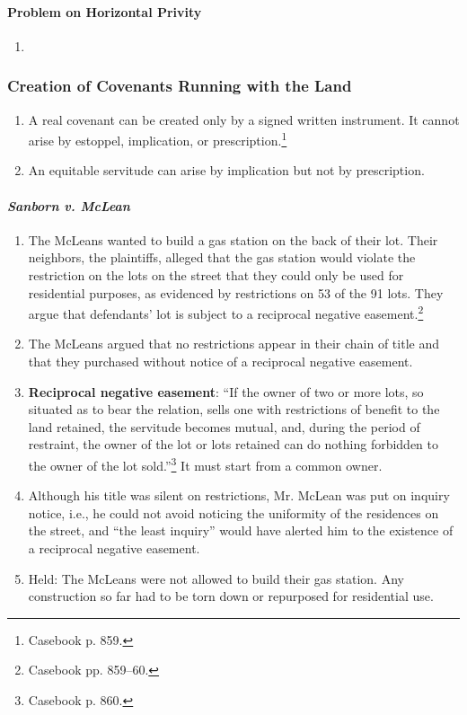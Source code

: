 \paragraph{Problem on Horizontal Privity}

\begin{enumerate}
    \item %
\end{enumerate}

\subsubsection{Creation of Covenants Running with the Land}

\begin{enumerate}
    \item A real covenant can be created only by a signed written instrument. 
    It cannot arise by estoppel, implication, or 
    prescription.\footnote{Casebook p. 859.}
    \item An equitable servitude can arise by implication but not by 
    prescription. %
\end{enumerate}

\paragraph{\emph{Sanborn v. McLean}}

\begin{enumerate}
    \item The McLeans wanted to build a gas station on the back of their lot. 
    Their neighbors, the plaintiffs, alleged that the gas station would 
    violate the restriction on the lots on the street that they could only be 
    used for residential purposes, as evidenced by restrictions on 53 of the 
    91 lots. They argue that defendants' lot is subject to a reciprocal 
    negative easement.\footnote{Casebook pp. 859--60.}
    \item The McLeans argued that no restrictions appear in their chain of 
    title and that they purchased without notice of a reciprocal negative 
    easement.
    \item \textbf{Reciprocal negative easement}: ``If the owner of two or more 
    lots, so situated as to bear the relation, sells one with restrictions of 
    benefit to the land retained, the servitude becomes mutual, and, during 
    the period of restraint, the owner of the lot or lots retained can do 
    nothing forbidden to the owner of the lot sold.''\footnote{Casebook p. 
    860.} It must start from a common owner.
    \item Although his title was silent on restrictions, Mr. McLean was put on 
    inquiry notice, i.e., he could not avoid noticing the uniformity of the 
    residences on the street, and ``the least inquiry'' would have alerted him 
    to the existence of a reciprocal negative easement.
    \item Held: The McLeans were not allowed to build their gas station. Any 
    construction so far had to be torn down or repurposed for residential use.
\end{enumerate}


